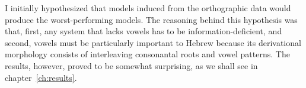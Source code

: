 I initially hypothesized that models induced from the orthographic 
data would produce the worst-performing models. The reasoning behind this 
hypothesis was that, first, any system that lacks vowels has 
to be information-deficient, and second, vowels must be particularly important to 
Hebrew because its derivational morphology consists of interleaving consonantal 
roots and vowel patterns. The results, however, proved to be somewhat surprising, 
as we shall see in chapter~\ref{ch:results}.


